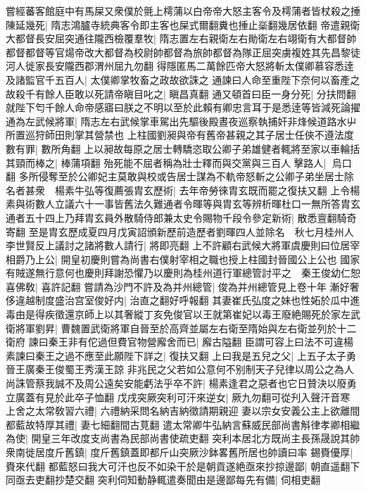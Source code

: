 嘗經蕃客館庭中有馬屎又衆僕於氈上樗蒲以白帝帝大怒主客令及樗蒲者皆杖殺之捶陳延幾死|{
	隋志鴻臚寺統典客令即主客也屎式爾翻糞也捶止橤翻幾居依翻}
帝遣親衛大都督長安屈突通往隴西檢覆羣牧|{
	隋志置左右親衛左右勛衛左右翊衛有大都督帥都督都督等官煬帝改大都督為校尉帥都督為旅帥都督為隊正屈突虜複姓其先昌黎徒河人徙家長安隴西郡渭州屈九勿翻}
得隱匿馬二萬餘匹帝大怒將斬太僕卿慕容悉逹及諸監官千五百人|{
	太僕卿掌牧畜之政故欲誅之}
通諫曰人命至重陛下奈何以畜產之故殺千有餘人臣敢以死請帝瞋目叱之|{
	瞋昌真翻}
通又頓首曰臣一身分死|{
	分扶問翻}
就陛下匄千餘人命帝感寤曰朕之不明以至於此賴有卿忠言耳于是悉逹等皆減死論擢通為左武候將軍|{
	隋志左右武候掌車駕出先驅後殿晝夜巡察執捕奸非烽候道路水屮所置巡狩師田則掌其營禁也}
上柱國劉昶與帝有舊帝甚親之其子居士任俠不遵法度數有罪|{
	數所角翻}
上以昶故每原之居士轉驕恣取公卿子弟雄健者輒將至家以車輪括其頸而棒之|{
	棒蒲項翻}
殆死能不屈者稱為壯士釋而與交黨與三百人擊路人|{
	烏口翻}
多所侵奪至於公卿妃主莫敢與校或告居士謀為不軌帝怒斬之公卿子弟坐居士除名者甚衆　楊素牛弘等復薦張胄玄歷術|{
	去年帝勞徠胄玄既而罷之復扶又翻}
上令楊素與術數人立議六十一事皆舊法久難通者令暉等與胄玄等辨析暉杜口一無所答胄玄通者五十四上乃拜胄玄員外散騎侍郎兼太史令賜物千段令參定新術|{
	散悉亶翻騎奇寄翻}
至是胄玄歷成夏四月戊寅詔頒新歷前造歷者劉暉四人並除名　秋七月桂州人李世賢反上議討之諸將數人請行|{
	將即亮翻}
上不許顧右武候大將軍虞慶則曰位居宰相爵乃上公|{
	開皇初慶則嘗為尚書右僕射宰相之職也授上柱國封晉國公上公也}
國家有賊遂無行意何也慶則拜謝恐懼乃以慶則為桂州道行軍總管討平之　秦王俊幼仁恕喜佛敎|{
	喜許記翻}
嘗請為沙門不許及為并州總管|{
	俊為并州總管見上卷十年}
漸好奢侈違越制度盛治宫室俊好内|{
	治直之翻好呼報翻}
其妻崔氏弘度之妹也性妬於瓜中進毒由是得疾徵還京師上以其奢縱丁亥免俊官以王就第崔妃以毒王廢絶賜死於家左武衛將軍劉昇|{
	曹魏置武衛將軍自晉至於高齊並屬左右衛至隋始與左右衛並列於十二衛府}
諫曰秦王非有佗過但費官物營廨舍而已|{
	廨古隘翻}
臣謂可容上曰法不可違楊素諫曰秦王之過不應至此願陛下詳之|{
	復扶又翻}
上曰我是五兒之父|{
	上五子太子勇晉王廣秦王俊蜀王秀漢王諒}
非兆民之父若如公意何不别制天子兒律以周公之為人尚誅管蔡我誠不及周公遠矣安能虧法乎卒不許|{
	楊素逢君之惡者也它日贊決以廢勇立廣蓋有見於此卒子恤翻}
戊戌突厥突利可汗來逆女|{
	厥九勿翻可從刋入聲汗音寒}
上舍之太常敎習六禮|{
	六禮納采問名納吉納徵請期親迎}
妻以宗女安義公主上欲離間都藍故特厚其禮|{
	妻七細翻間古莧翻}
遣太常卿牛弘納言蘇威民部尚書斛律孝卿相繼為使|{
	開皇三年改度支尚書為民部尚書使疏吏翻}
突利本居北方既尚主長孫晟說其帥衆南徙居度斤舊鎮|{
	度斤舊鎮蓋即都斤山突厥沙鉢畧舊所居也帥讀曰率}
錫賚優厚|{
	賚來代翻}
都藍怒曰我大可汗也反不如染干於是朝貢遂絶亟來抄掠邊鄙|{
	朝直遥翻下同亟去吏翻抄楚交翻}
突利伺知動静輒遣奏聞由是邊鄙每先有備|{
	伺相吏翻}
